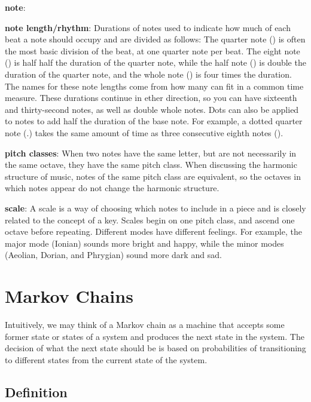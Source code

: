 \textbf{note}: 

\textbf{note length/rhythm}: Durations of notes used to indicate how much of each beat a note should occupy and are divided as follows:
The quarter note (\quarternote) is often the most basic division of the beat, at one quarter note per beat.
The eight note (\eighthnote) is half half the duration of the quarter note, while the half note (\halfnote) is double the duration of the quarter note, and the whole note (\fullnote) is four times the duration.
The names for these note lengths come from how many can fit in a common time measure.
These durations continue in ether direction, so you can have sixteenth and thirty-second notes, as well as double whole notes.
Dots can also be applied to notes to add half the duration of the base note.
For example, a dotted quarter note (\quarternote.) takes the same amount of time as three consecutive eighth notes (\eighthnote \eighthnote \eighthnote).


\textbf{pitch classes}: When two notes have the same letter, but are not necessarily in the same octave, they have the same pitch class.
When discussing the harmonic structure of music, notes of the same pitch class are equivalent, so the octaves in which notes appear do not change the harmonic structure.

\textbf{scale}: A scale is a way of choosing which notes to include in a piece and is closely related to the concept of a key.
Scales begin on one pitch class, and ascend one octave before repeating.
Different modes have different feelings.
For example, the major mode (Ionian) sounds more bright and happy, while the minor modes (Aeolian, Dorian, and Phrygian) sound more dark and sad.

\section[Markov Chains]{Markov Chains} \label{bg:markov}

Intuitively, we may think of a Markov chain as a machine that accepts some former state or states of a system and produces the next state in the system.
The decision of what the next state should be is based on probabilities of transitioning to different states from the current state of the system.

\subsection{Definition} \label{bg:markov:definitions}


